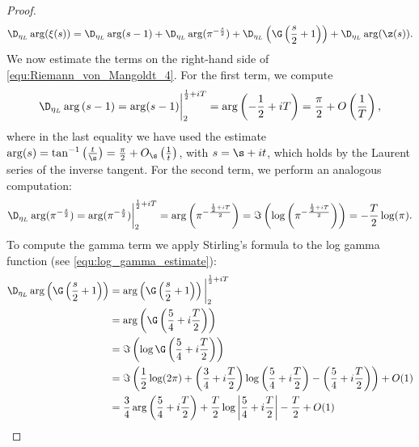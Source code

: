 \begin{proof}
        \begin{equation}\label{equ:Riemann_von_Mangoldt_4}
          \D_{\eta_{L}}\arg(\xi(s)) = \D_{\eta_{L}}\arg(s-1)+\D_{\eta_{L}}\arg(\pi^{-\frac{s}{2}})+\D_{\eta_{L}}\left(\G\left(\frac{s}{2}+1\right)\right)+\D_{\eta_{L}}\arg(\z(s)).
        \end{equation}
        We now estimate the terms on the right-hand side of \cref{equ:Riemann_von_Mangoldt_4}. For the first term, we compute
        \begin{equation}\label{equ:Riemann_von_Mangoldt_5}
          \D_{\eta_{L}}\arg\left(s-1\right) = \arg(s-1)\bigg|_{2}^{\frac{1}{2}+iT} = \arg\left(-\frac{1}{2}+iT\right) = \frac{\pi}{2}+O\left(\frac{1}{T}\right),
        \end{equation}
        where in the last equality we have used the estimate $\arg(s) = \tan^{-1}\left(\frac{t}{\s}\right) = \frac{\pi}{2}+O_{\s}\left(\frac{1}{t}\right)$, with $s = \s+it$, which holds by the Laurent series of the inverse tangent. For the second term, we perform an analogous computation:
        \begin{equation}\label{equ:Riemann_von_Mangoldt_6}
          \D_{\eta_{L}}\arg(\pi^{-\frac{s}{2}}) = \arg(\pi^{-\frac{s}{2}})\bigg|_{2}^{\frac{1}{2}+iT} = \arg\left(\pi^{-\frac{\frac{1}{2}+iT}{2}}\right) = \Im\left(\log\left(\pi^{-\frac{\frac{1}{2}+iT}{2}}\right)\right) = -\frac{T}{2}\log(\pi).
        \end{equation}
        To compute the gamma term we apply Stirling's formula to the log gamma function (see \cref{equ:log_gamma_estimate}):
        \begin{equation}\label{equ:Riemann_von_Mangoldt_7}
          \begin{aligned}
            \D_{\eta_{L}}\arg\left(\G\left(\frac{s}{2}+1\right)\right) &= \arg\left(\G\left(\frac{s}{2}+1\right)\right)\bigg|_{2}^{\frac{1}{2}+iT} \\
            &= \arg\left(\G\left(\frac{5}{4}+i\frac{T}{2}\right)\right) \\
            &= \Im\left(\log\G\left(\frac{5}{4}+i\frac{T}{2}\right)\right) \\
            &= \Im\left(\frac{1}{2}\log(2\pi)+\left(\frac{3}{4}+i\frac{T}{2}\right)\log\left(\frac{5}{4}+i\frac{T}{2}\right)-\left(\frac{5}{4}+i\frac{T}{2}\right)\right)+O(1) \\
            &= \frac{3}{4}\arg\left(\frac{5}{4}+i\frac{T}{2}\right)+\frac{T}{2}\log\left|\frac{5}{4}+i\frac{T}{2}\right|-\frac{T}{2}+O(1) \\

\end{aligned}
\end{equation}
\end{proof}
